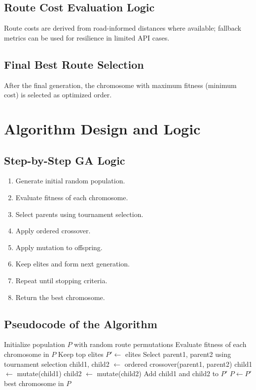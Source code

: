 \documentclass[12pt,a4paper]{report}
\begin{document}
\section{Route Cost Evaluation Logic}
Route costs are derived from road-informed distances where available; fallback metrics can be used for resilience in limited API cases.

\section{Final Best Route Selection}
After the final generation, the chromosome with maximum fitness (minimum cost) is selected as optimized order.

\chapter{Algorithm Design and Logic}

\section{Step-by-Step GA Logic}
\begin{enumerate}
    \item Generate initial random population.
    \item Evaluate fitness of each chromosome.
    \item Select parents using tournament selection.
    \item Apply ordered crossover.
    \item Apply mutation to offspring.
    \item Keep elites and form next generation.
    \item Repeat until stopping criteria.
    \item Return the best chromosome.
\end{enumerate}

\section{Pseudocode of the Algorithm}
\begin{algorithm}[H]
\caption{GA for Multi-stop Route Optimization}
\begin{algorithmic}[1]
\State Initialize population $P$ with random route permutations
    \State Evaluate fitness of each chromosome in $P$
    \State Keep top elites
    \State $P' \gets$ elites
        \State Select parent1, parent2 using tournament selection
        \State child1, child2 $\gets$ ordered crossover(parent1, parent2)
        \State child1 $\gets$ mutate(child1)
        \State child2 $\gets$ mutate(child2)
        \State Add child1 and child2 to $P'$
    \EndWhile
    \State $P \gets P'$
\EndFor
\State \Return best chromosome in $P$
\end{algorithmic}
\end{algorithm}
\end{document}
